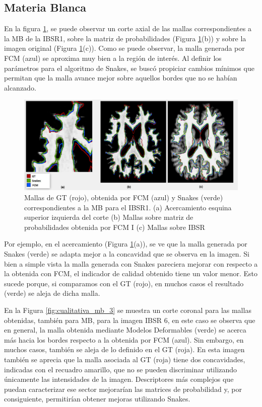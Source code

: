 \subsection{Materia Blanca}
En la figura \ref{fig:cualitativa_mb_2}, se puede observar un corte axial de las mallas correspondientes a la MB de la IBSR1, sobre la matriz de probabilidades (Figura \ref{fig:cualitativa_mb_2}(b)) y sobre la imagen original (Figura \ref{fig:cualitativa_mb_2}(c)). Como se puede observar, la malla generada por FCM (azul) se aproxima muy bien a la región de interés. Al definir los parámetros para el algoritmo de Snakes, se buscó propiciar cambios mínimos que permitan que la malla avance mejor sobre aquellos bordes que no se habían alcanzado. 


\begin{figure}[H]
	\centering
	\includegraphics[scale=0.08]{images/MB_2.jpg}
	\caption{Mallas de GT (rojo), obtenida por FCM (azul) y Snakes (verde) correspondientes a la MB para el IBSR1. (a) Acercamiento esquina superior izquierda del corte (b) Mallas sobre matriz de probabilidades obtenida por FCM I (c) Mallas sobre IBSR}
	\label{fig:cualitativa_mb_2}
\end{figure}

Por ejemplo, en el acercamiento (Figura \ref{fig:cualitativa_mb_2}(a)), se ve que la malla generada por Snakes (verde) se adapta mejor a la concavidad que se observa en la imagen. 
Si bien a simple vista la malla generada con Snakes pareciera mejorar con respecto a la obtenida con FCM, el indicador de calidad obtenido tiene un valor menor. Esto sucede porque, si comparamos con el GT (rojo), en muchos casos el resultado (verde) se aleja de dicha malla.

En la Figura \ref{fig:cualitativa_mb_3} se muestra un corte coronal para las mallas obtenidas, también para MB, para la imagen IBSR 6, en este caso se observa que en general, la malla obtenida mediante Modelos Deformables (verde) se acerca más hacia los bordes respecto a la obtenida por FCM (azul). Sin embargo, en muchos casos, también se aleja de lo definido en el GT (roja). En esta imagen también se aprecia que la malla asociada al GT (roja) tiene dos concavidades, indicadas con el recuadro amarillo, que no se pueden discriminar utilizando únicamente las intensidades de la imagen. Descriptores más complejos que puedan caracterizar ese sector mejorarían las matrices de probabilidad y, por consiguiente, permitirían obtener mejoras utilizando Snakes.

